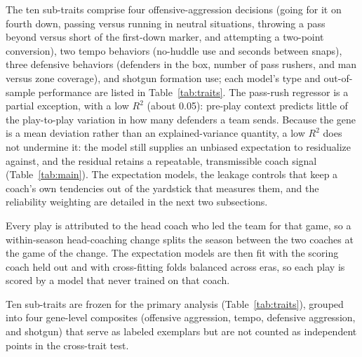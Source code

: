 \documentclass[
  journal=ehs,
  manuscript=article,
  year=2026,
  volume=8,
]{cup-journal}
\begin{document}
The ten sub-traits comprise four offensive-aggression decisions (going for it on
fourth down, passing versus running in neutral situations, throwing a pass beyond
versus short of the first-down marker, and attempting a two-point conversion), two
tempo behaviors (no-huddle use and seconds between snaps), three defensive behaviors
(defenders in the box, number of pass rushers, and man versus zone coverage), and
shotgun formation use; each model's type and out-of-sample performance are listed in
Table~\ref{tab:traits}. The pass-rush regressor is a partial exception, with a low
$R^2$ (about 0.05): pre-play context predicts little of the play-to-play variation in
how many defenders a team sends. Because the gene is a mean deviation rather than an
explained-variance quantity, a low $R^2$ does not undermine it: the model still
supplies an unbiased expectation to residualize against, and the residual retains a
repeatable, transmissible coach signal (Table~\ref{tab:main}). The expectation models,
the leakage controls that keep a coach's own tendencies out of the yardstick that
measures them, and the reliability weighting are detailed in the next two subsections.

Every play is attributed to the head coach who led the team for that game, so a
within-season head-coaching change splits the season between the two coaches at the
game of the change. The expectation models are then fit with the scoring coach held
out and with cross-fitting folds balanced across eras, so each play is scored by a
model that never trained on that coach.

Ten sub-traits are frozen for the primary analysis (Table~\ref{tab:traits}),
grouped into four gene-level composites (offensive aggression, tempo, defensive
aggression, and shotgun) that serve as labeled exemplars but are not counted as
independent points in the cross-trait test.
\end{document}
